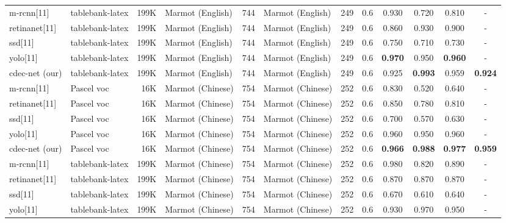 \documentclass[a4paper,conference]{IEEEtran}
\begin{document}
\begin{table*}[ht!]
\begin{center}
\begin{tabular}{|l| l | r|l |r|l|r| c| c c c c|}
\hhline{|=|=|=|=|=|=|=|=|====|}
{\sc m-rcnn}[11] &{\sc t}able{\sc b}ank-{\sc l}a{\sc t}e{\sc x} &199K &Marmot (English) &744 &Marmot (English) &249 &0.6 &0.930 &0.720 &0.810 &- \\
{\sc r}etina{\sc n}et[11] &{\sc t}able{\sc b}ank-{\sc l}a{\sc t}e{\sc x} &199K &Marmot (English) &744 &Marmot (English) &249 &0.6 &0.860 &0.930 &0.900 &- \\
{\sc ssd}[11] &{\sc t}able{\sc b}ank-{\sc l}a{\sc t}e{\sc x} &199K &Marmot (English) &744 &Marmot (English) &249 &0.6 &0.750 &0.710 &0.730 &- \\
{\sc yolo}[11] &{\sc t}able{\sc b}ank-{\sc l}a{\sc t}e{\sc x} &199K &Marmot (English) &744 &Marmot (English) &249 &0.6 &\textbf{0.970} &0.950 &\textbf{0.960} &- \\
{\sc cd}e{\sc c-n}et (our) &{\sc t}able{\sc b}ank-{\sc l}a{\sc t}e{\sc x} &199K &Marmot (English) &744 &Marmot (English) &249 &0.6 &0.925 &\textbf{0.993} &0.959 &\textbf{0.924}  \\ \hhline{|=|=|=|=|=|=|=|=|====|}
{\sc m-rcnn}[11] &Pascel {\sc voc} &16K &Marmot (Chinese) &754 &Marmot (Chinese) &252 &0.6 &0.830 &0.520 &0.640 &- \\
{\sc r}etina{\sc n}et[11] &Pascel {\sc voc} &16K &Marmot (Chinese) &754 &Marmot (Chinese) &252 &0.6 &0.850 &0.780 &0.810 &- \\
{\sc ssd}[11] &Pascel {\sc voc} &16K &Marmot (Chinese) &754 &Marmot (Chinese) &252 &0.6 &0.700 &0.570 &0.630 &- \\
{\sc yolo}[11] &Pascel {\sc voc} &16K &Marmot (Chinese) &754 &Marmot (Chinese) &252 &0.6 &0.960 &0.950 &0.960 &- \\
{\sc cd}e{\sc c-n}et (our) &Pascel {\sc voc} &16K &Marmot (Chinese) &754 &Marmot (Chinese) &252 &0.6 &\textbf{0.966} &\textbf{0.988} &\textbf{0.977} &\textbf{0.959} \\ 
\hhline{|=|=|=|=|=|=|=|=|====|}
{\sc m-rcnn}[11] &{\sc t}able{\sc b}ank-{\sc l}a{\sc t}e{\sc x} &199K &Marmot (Chinese) &754 &Marmot (Chinese) &252 &0.6 &0.980 &0.820 &0.890 &- \\
{\sc r}etina{\sc n}et[11] &{\sc t}able{\sc b}ank-{\sc l}a{\sc t}e{\sc x} &199K &Marmot (Chinese) &754 &Marmot (Chinese) &252 &0.6 &0.870 &0.870 &0.870 &- \\
{\sc ssd}[11] &{\sc t}able{\sc b}ank-{\sc l}a{\sc t}e{\sc x} &199K &Marmot (Chinese) &754 &Marmot (Chinese) &252 &0.6 &0.670 &0.610 &0.640 &- \\
{\sc yolo}[11] &{\sc t}able{\sc b}ank-{\sc l}a{\sc t}e{\sc x} &199K &Marmot (Chinese) &754 &Marmot (Chinese) &252 &0.6 &0.930 &0.970 &0.950 &- \\

\end{tabular}
\end{center}
\end{table*}
\end{document}
